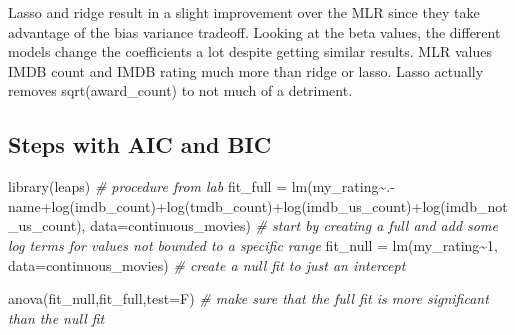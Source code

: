 \documentclass[
]{article}
\newenvironment{Shaded}{\begin{snugshade}}{\end{snugshade}}
\newcommand{\AttributeTok}[1]{\textcolor[rgb]{0.77,0.63,0.00}{#1}}
\newcommand{\CommentTok}[1]{\textcolor[rgb]{0.56,0.35,0.01}{\textit{#1}}}
\newcommand{\DecValTok}[1]{\textcolor[rgb]{0.00,0.00,0.81}{#1}}
\newcommand{\FunctionTok}[1]{\textcolor[rgb]{0.00,0.00,0.00}{#1}}
\newcommand{\NormalTok}[1]{#1}
\newcommand{\OtherTok}[1]{\textcolor[rgb]{0.56,0.35,0.01}{#1}}
\newcommand{\SpecialCharTok}[1]{\textcolor[rgb]{0.00,0.00,0.00}{#1}}
\newcommand{\StringTok}[1]{\textcolor[rgb]{0.31,0.60,0.02}{#1}}
\begin{document}
Lasso and ridge result in a slight improvement over the MLR since they
take advantage of the bias variance tradeoff. Looking at the beta
values, the different models change the coefficients a lot despite
getting similar results. MLR values IMDB count and IMDB rating much more
than ridge or lasso. Lasso actually removes sqrt(award\_count) to not
much of a detriment.

\hypertarget{steps-with-aic-and-bic}{%
\subsection{Steps with AIC and BIC}\label{steps-with-aic-and-bic}}

\begin{Shaded}
\begin{Highlighting}[]
\FunctionTok{library}\NormalTok{(leaps) }\CommentTok{\# procedure from lab}
\NormalTok{fit\_full }\OtherTok{=} \FunctionTok{lm}\NormalTok{(my\_rating}\SpecialCharTok{\textasciitilde{}}\NormalTok{.}\SpecialCharTok{{-}}\NormalTok{name}\SpecialCharTok{+}\FunctionTok{log}\NormalTok{(imdb\_count)}\SpecialCharTok{+}\FunctionTok{log}\NormalTok{(tmdb\_count)}\SpecialCharTok{+}\FunctionTok{log}\NormalTok{(imdb\_us\_count)}\SpecialCharTok{+}\FunctionTok{log}\NormalTok{(imdb\_not\_us\_count), }\AttributeTok{data=}\NormalTok{continuous\_movies) }\CommentTok{\# start by creating a full and add some log terms for values not bounded to a specific range}
\NormalTok{fit\_null }\OtherTok{=} \FunctionTok{lm}\NormalTok{(my\_rating}\SpecialCharTok{\textasciitilde{}}\DecValTok{1}\NormalTok{, }\AttributeTok{data=}\NormalTok{continuous\_movies) }\CommentTok{\# create a null fit to just an intercept}
\end{Highlighting}
\end{Shaded}

\begin{Shaded}
\begin{Highlighting}[]
\FunctionTok{anova}\NormalTok{(fit\_null,fit\_full,}\AttributeTok{test=}\StringTok{\textquotesingle{}F\textquotesingle{}}\NormalTok{) }\CommentTok{\# make sure that the full fit is more significant than the null fit}
\end{Highlighting}
\end{Shaded}
\end{document}
